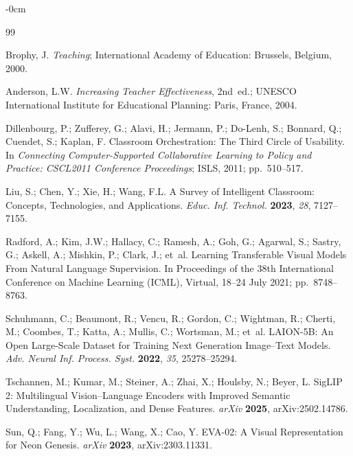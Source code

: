 \documentclass[symmetry,article,submit,pdftex,moreauthors]{Definitions/mdpi}
\begin{document}
\begin{adjustwidth}{-\extralength}{0cm}


\begin{thebibliography}{99}

Brophy, J.
\textit{Teaching}; International Academy of Education: Brussels, Belgium, 2000.

Anderson, L.W.
\textit{Increasing Teacher Effectiveness}, 2nd~ed.; UNESCO International Institute for Educational Planning: Paris, France, 2004.

Dillenbourg, P.; Zufferey, G.; Alavi, H.; Jermann, P.; Do-Lenh, S.; Bonnard, Q.; Cuendet, S.; Kaplan, F.
Classroom Orchestration: The Third Circle of Usability.
In \textit{Connecting Computer-Supported Collaborative Learning to Policy and Practice: CSCL2011 Conference Proceedings}; ISLS, 2011; pp.~510--517.

Liu, S.; Chen, Y.; Xie, H.; Wang, F.L.
A Survey of Intelligent Classroom: Concepts, Technologies, and Applications.
\textit{Educ. Inf. Technol.} \textbf{2023}, \textit{28}, 7127--7155.

Radford, A.; Kim, J.W.; Hallacy, C.; Ramesh, A.; Goh, G.; Agarwal, S.; Sastry, G.; Askell, A.; Mishkin, P.; Clark, J.; et~al.
Learning Transferable Visual Models From Natural Language Supervision.
In Proceedings of the 38th International Conference on Machine Learning (ICML), Virtual, 18--24 July 2021; pp.~8748--8763.

Schuhmann, C.; Beaumont, R.; Vencu, R.; Gordon, C.; Wightman, R.; Cherti, M.; Coombes, T.; Katta, A.; Mullis, C.; Wortsman, M.; et~al.
LAION-5B: An Open Large-Scale Dataset for Training Next Generation Image--Text Models.
\textit{Adv. Neural Inf. Process. Syst.} \textbf{2022}, \textit{35}, 25278--25294.

Tschannen, M.; Kumar, M.; Steiner, A.; Zhai, X.; Houlsby, N.; Beyer, L.
SigLIP 2: Multilingual Vision--Language Encoders with Improved Semantic Understanding, Localization, and Dense Features.
\textit{arXiv} \textbf{2025}, arXiv:2502.14786.

Sun, Q.; Fang, Y.; Wu, L.; Wang, X.; Cao, Y.
EVA-02: A Visual Representation for Neon Genesis.
\textit{arXiv} \textbf{2023}, arXiv:2303.11331.


\end{thebibliography}
\end{adjustwidth}
\end{document}
